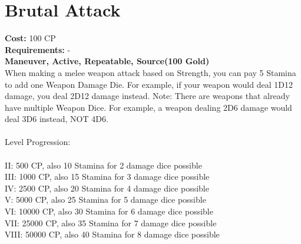 \section{Brutal Attack}
\textbf{Cost:} 100 CP\\
\textbf{Requirements:} -\\
\textbf{Maneuver, Active, Repeatable, Source(100 Gold)}\\
When making a melee weapon attack based on Strength, you can pay 5 Stamina to add one Weapon Damage Die. For example, if your weapon would deal 1D12 damage, you deal 2D12 damage instead. Note: There are weapons that already have multiple Weapon Dice. For example, a weapon dealing 2D6 damage would deal 3D6 instead, NOT 4D6.\\
\\
Level Progression:\\
\\
II: 500 CP, also 10 Stamina for 2 damage dice possible\\
III: 1000 CP, also 15 Stamina for 3 damage dice possible\\
IV: 2500 CP, also 20 Stamina for 4 damage dice possible\\
V: 5000 CP, also 25 Stamina for 5 damage dice possible\\
VI: 10000 CP, also 30 Stamina for 6 damage dice possible\\
VII: 25000 CP, also 35 Stamina for 7 damage dice possible\\
VIII: 50000 CP, also 40 Stamina for 8 damage dice possible\\